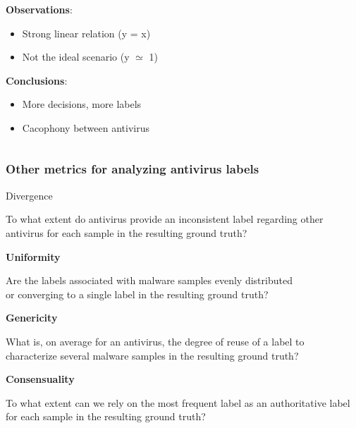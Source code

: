 \begin{frame}
\begin{columns}
\begin{column}{0.55\textwidth}
            \bigskip{}
            \textbf{Observations}:\\
            \smallskip{}
            \begin{itemize}
                \item Strong linear relation (y = x)
                \item Not the ideal scenario (y $\simeq$ 1)
            \end{itemize}

            \bigskip{}
            \textbf{Conclusions}:\\
            \smallskip{}
            \begin{itemize}
                \item More decisions, more labels
                \item Cacophony between antivirus
            \end{itemize}

        \end{column}
    \end{columns}

\end{frame}

\begin{frame}
    \frametitle{Other metrics for analyzing antivirus labels}
    \centering

    \begin{block}{}
        \centering
        Divergence \\
    \end{block}
    \small{
        To what extent do antivirus provide an inconsistent label regarding other antivirus for each sample in the resulting ground truth?
    }

    \begin{block}{}
        \centering
        \textbf{Uniformity} \\
    \end{block}
    \small{
        Are the labels associated with malware samples evenly distributed \\
        or converging to a single label in the resulting ground truth?
    }

    \begin{block}{}
        \centering
        \textbf{Genericity} \\
    \end{block}
    \small{
        What is, on average for an antivirus, the degree of reuse of a label to \\
        characterize several malware samples in the resulting ground truth?
    }

    \begin{block}{}
        \centering
        \textbf{Consensuality} \\
    \end{block}
    \small{
        To what extent can we rely on the most frequent label
        as an authoritative label for each sample in the resulting ground truth?
    }

\end{frame}


